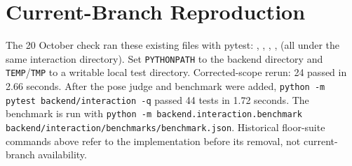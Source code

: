 \section{Current-Branch Reproduction}
The 20 October check ran these existing files with pytest: , , , ,  (all under the same interaction directory). Set \texttt{PYTHONPATH} to the backend directory and \texttt{TEMP}/\texttt{TMP} to a writable local test directory. Corrected-scope rerun: 24 passed in 2.66 seconds. After the pose judge and benchmark were added, \texttt{python -m pytest backend/interaction -q} passed 44 tests in 1.72 seconds. The benchmark is run with \texttt{python -m backend.interaction.benchmark backend/interaction/benchmarks/benchmark.json}. Historical floor-suite commands above refer to the implementation before its removal, not current-branch availability.
